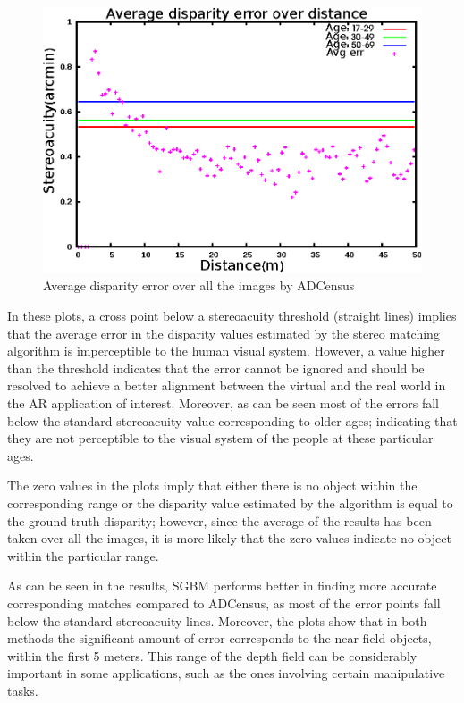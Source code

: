 \begin{figure}[H]
\centering
\includegraphics[scale=0.8]{adcenmsk3}
\caption{Average disparity error over all the images by ADCensus}
\label{fig:mskmapadc}
\end{figure} 

In these plots, a cross point below a stereoacuity threshold (straight lines) implies that the average error in the disparity values estimated 
by the stereo matching 
algorithm is imperceptible to the human visual system. However, a value higher than the threshold indicates that
the error cannot be ignored and should be resolved to achieve a better alignment between the virtual and the 
real world in the AR application of interest. Moreover, as can be seen most of the errors
fall below the standard stereoacuity value corresponding to older ages; indicating that they are not perceptible to the visual system of the people at these 
particular ages.

The zero values in the plots imply that either there is no object within the corresponding range or the disparity value estimated by the algorithm
is equal to the ground truth disparity; however, since the average of the results has been taken over all the images, it is more likely that 
the zero values indicate no object within the particular range.

As can be seen in the results, SGBM performs better in finding more accurate corresponding matches 
compared to ADCensus, as most of the error points fall below the standard stereoacuity lines. Moreover, the plots show that in both methods 
the significant amount of error
corresponds to the near field objects, within the first 5 meters. This range of the depth field can be considerably important in some applications,
such as the ones involving certain manipulative tasks.


